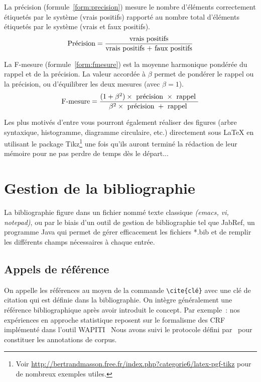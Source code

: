 \documentclass{report}
\begin{document}
 La précision
(formule~\ref{form:precision}) mesure le nombre d'éléments
correctement étiquetés par le système (vrais positifs) rapporté au
nombre total d'éléments étiquetés par le système (vrais et faux
positifs).
%
\begin{equation}
  \centering
  \text{Précision} = {{\text{vrais positifs}}\over{\text{vrais positifs + faux positifs}}}
  \label{form:precision}
\end{equation}

 La F-mesure (formule~\ref{form:fmesure}) est la
moyenne harmonique pondérée du rappel et de la précision. La valeur
accordée à $\beta$ permet de pondérer le rappel ou la précision, ou
d'équilibrer les deux mesures (avec $\beta=1$).
%
\begin{equation}
  \centering
  \text{F-mesure} = {{(1+\beta^2) \times \text{ précision } \times \text{ rappel }}\over{\beta^2 \times \text{ précision } + \text{ rappel } }}
  \label{form:fmesure}
\end{equation}

Les plus motivés d'entre vous pourront également réaliser des figures
(arbre syntaxique, histogramme, diagramme circulaire, etc.)
directement sous \LaTeX{} en utilisant le package Tikz\footnote{Voir
  \url{http://bertrandmasson.free.fr/index.php?categorie6/latex-pgf-tikz}
  pour de nombreux exemples utiles.} une fois qu'ils auront terminé la
rédaction de leur mémoire pour ne pas perdre de temps dès le départ...



\section{Gestion de la bibliographie}
La  bibliographie figure dans un fichier nommé
texte classique \emph{(emacs, vi, notepad)}, ou par le biais d'un
outil de gestion de bibliographie tel que \textsf{JabRef}, un
programme Java qui permet de gérer efficacement les fichiers *.bib et
de remplir les différents champs nécessaires à chaque entrée.

\subsection{Appels de référence}
On appelle les références au moyen de la
commande \verb+\cite{clé}+ avec une clé de citation qui est définie
dans la bibliographie. On intègre généralement une référence
bibliographique après avoir introduit le concept. Par exemple~: nos
expériences en approche statistique reposent sur le formalisme des
CRF~	%
implémenté dans l'outil
WAPITI~%
Nous avons suivi le protocole défini
par~%
pour constituer les annotations de corpus.
\end{document}
